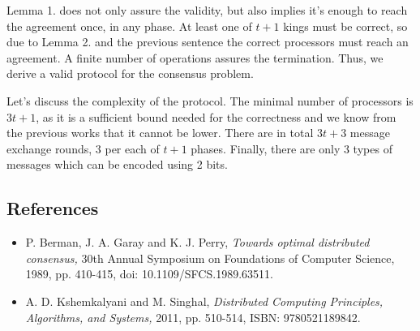 \documentclass[11pt, a4paper]{report}
\begin{document}
Lemma 1. does not only assure the validity, but also implies it's enough to reach the agreement once, in any phase. At least one of $t+1$ kings must be correct, so due to Lemma 2. and the previous sentence the correct processors must reach an agreement. A finite number of operations assures the termination. Thus, we derive a valid protocol for the consensus problem.

Let's discuss the complexity of the protocol. The minimal number of processors is $3t+1$, as it is a sufficient bound needed for the correctness and we know from the previous works that it cannot be lower. There are in total $3t+3$ message exchange rounds, 3 per each of $t+1$ phases. Finally, there are only 3 types of messages which can be encoded using 2 bits.

\subsection*{References}
\begin{itemize}
    \item P. Berman, J. A. Garay and K. J. Perry, \emph{Towards optimal distributed consensus,} 30th Annual Symposium on Foundations of Computer Science, 1989, pp. 410-415, doi: 10.1109/SFCS.1989.63511.
    \item A. D. Kshemkalyani and M. Singhal, \emph{Distributed Computing Principles, Algorithms, and Systems,} 2011, pp. 510-514, ISBN: 9780521189842.
\end{itemize}
\end{document}
